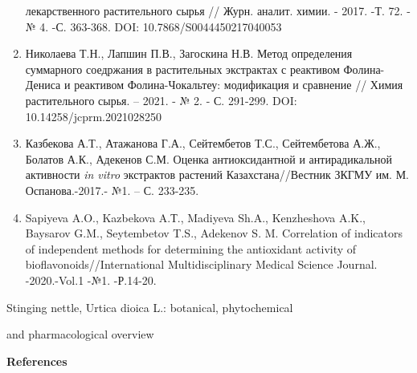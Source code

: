 \begin{enumerate}
  лекарственного растительного сырья // Журн. аналит. химии. - 2017. -Т.
  72. -№ 4. -С. 363-368. DOI: 10.7868/S0044450217040053
\item
  Николаева Т.Н., Лапшин П.В., Загоскина Н.В. Метод определения
  суммарного соедржания в растительных экстрактах с реактивом
  Фолина-Дениса и реактивом Фолина-Чокальтеу: модификация и сравнение //
  Химия растительного сырья. -- 2021. - № 2. - С. 291-299. DOI:
  10.14258/jcprm.2021028250
\item
  Казбекова А.Т., Атажанова Г.А., Сейтембетов Т.С., Сейтембетова А.Ж.,
  Болатов А.К., Адекенов С.М. Оценка антиоксидантной и антирадикальной
  активности \emph{in vitro} экстрактов растений Казахстана//Вестник
  ЗКГМУ им. М. Оспанова.-2017.- №1. -- С. 233-235.
\item
  Sapiyeva A.O., Kazbekova A.Т., Madiyeva Sh.A., Kenzheshova A.K.,
  Baysarov G.M., Seytembetov T.S., Adekenov S. M. Correlation of
  indicators of independent methods for determining the antioxidant
  activity of bioflavonoids//International Multidisciplinary Medical
  Science Journal. -2020.-Vol.1 -№1. -Р.14-20.
\end{enumerate}

Stinging nettle, Urtica dioica L.: botanical, phytochemical

and pharmacological overview

{\bfseries References}


